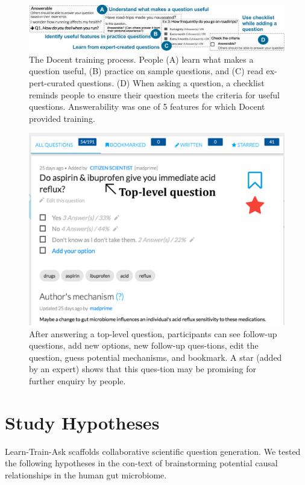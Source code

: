 \begin{figure}[h] 
  \centering
  \includegraphics[width=1.0\textwidth]{figures/docent/fig-3.png}
  \caption[]
{The Docent training process. People (A) learn what makes a question useful, (B) practice on sample questions, and (C) read ex-pert-curated questions. (D) When asking a question, a checklist reminds people to ensure their question meets the criteria for useful questions. Answerability was one of 5 features for which Docent provided training.}
  \label{fig:docent-3}
\end{figure}

\begin{figure}[h] 
  \centering
  \includegraphics[width=1.0\textwidth]{figures/docent/fig-4.png}
  \caption[]
{After answering a top-level question, participants can see follow-up questions, add new options, new follow-up ques-tions, edit the question, guess potential mechanisms, and bookmark. A star (added by an expert) shows that this ques-tion may be promising for further enquiry by people.}
  \label{fig:docent-4}
\end{figure}

\section{Study Hypotheses}
Learn-Train-Ask scaffolds collaborative scientific question generation. We tested the following hypotheses in the con-text of brainstorming potential causal relationships in the human gut microbiome.

